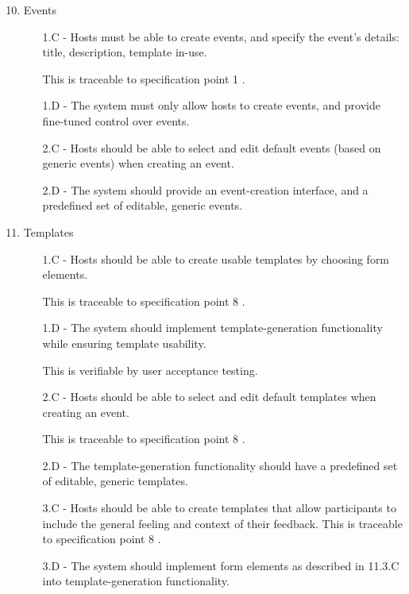 \documentclass[9pt, titlepage]{extarticle}
\begin{document}
\vspace*{1mm}
\begin{enumerate}[leftmargin=*]
\setcounter{enumi}{9}

\item Events
\begin{enumerate}[noitemsep, topsep=0pt, leftmargin=9mm]
\item[1.C -] Hosts must be able to create events, and specify the event's details: title, description, template in-use. 
\item[] This is traceable to specification point 1 \autocite{web:spec}.
\item[1.D -] The system must only allow hosts to create events, and provide fine-tuned control over events.
\vspace*{1mm}
\item[2.C -] Hosts should be able to select and edit default events (based on generic events) when creating an event.
\item[2.D -] The system should provide an event-creation interface, and a predefined set of editable, generic events.
\end{enumerate}

\item Templates
\begin{enumerate}[noitemsep, topsep=0pt, leftmargin=9mm]
\item[1.C -] Hosts should be able to create usable templates by choosing form elements. 
\item[] This is traceable to specification point 8 \autocite{web:spec}.
\item[1.D -] The system should implement template-generation functionality while ensuring template usability. 
\item[] This is verifiable by user acceptance testing.
\vspace*{1mm}
\item[2.C -] Hosts should be able to select and edit default templates when creating an event. 
\item[] This is traceable to specification point 8 \autocite{web:spec}.
\item[2.D -] The template-generation functionality should have a predefined set of editable, generic templates.
\vspace*{1mm}
\item[3.C -] Hosts should be able to create templates that allow participants to include the general feeling and context of their feedback. This is traceable to specification point 8 \autocite{web:spec}.
\item[3.D -] The system should implement form elements as described in 11.3.C into template-generation functionality. 
\end{enumerate}


\end{enumerate}
\end{document}
